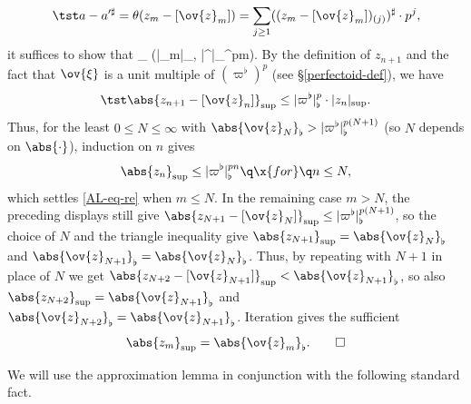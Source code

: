  \[
\tst a - a'^\sharp =  \theta(z_m - [\ov{z}_m]) = \sum_{j \ge 1} ((z_m - [\ov{z}_m])_{(j)})^\sharp\cdot p^j, %
\]
it suffices to show that
\be \label{AL-eq-re}
_{\sup} \le \max(|_m|_\flat, |\varpi^\flat|_\flat^{pm}).%
\ee
By the definition of $z_{n + 1}$ and the fact that $\ov{\xi}$ is a unit multiple of $(\varpi^\flat)^p$ (see \S\ref{perfectoid-def}), we have
\[%
\source{purity-flat-cohomology}
\tst %
\abs{ z_{n + 1} - [\ov{z}_n]}_{\sup} \le |\varpi^\flat|_\flat^p \cdot |z_n|_{\sup}.
\]%
Thus, for the least $0 \le N \le \infty$ with $\abs{\ov{z}_N}_\flat > |\varpi^\flat|_\flat^{p(N + 1)}$ (so $N$ depends on $\abs{\cdot}$), induction on $n$ gives
\[
\abs{z_n}_{\sup} \le |\varpi^\flat|_\flat^{pn} \q \x{for} \q n \le N,
\]
which settles \eqref{AL-eq-re} when $m \le N$. %
In the remaining case $m > N$, the preceding displays still give $\abs{ z_{N + 1} - [\ov{z}_N]}_{{\sup}} \le |\varpi^\flat|_\flat^{p(N + 1)}$, so the choice of $N$ %
and the triangle inequality give $\abs{z_{N + 1}}_{\sup} = \abs{\ov{z}_N}_\flat$ and $\abs{\ov{z}_{N + 1}}_\flat = \abs{\ov{z}_N}_\flat$. Thus, by repeating with $N + 1$ in place of $N$ we get $\abs{z_{N + 2} - [\ov{z}_{N + 1}]}_{\sup} < \abs{\ov{z}_{N + 1}}_\flat$, so also $\abs{z_{N + 2}}_{\sup} = \abs{\ov{z}_{N + 1}}_\flat$ and $\abs{\ov{z}_{N + 2}}_\flat = \abs{\ov{z}_{N + 1}}_\flat$. Iteration %
gives the sufficient
\[
\abs{z_m}_{\sup} = \abs{\ov{z}_m}_\flat.\qedhere%
\]
\epf







We will use the approximation lemma in conjunction with the following standard fact.

